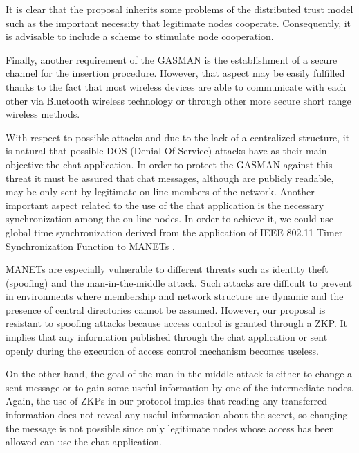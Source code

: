\documentclass{article}
\begin{document}
It is clear that the proposal inherits some problems of the distributed trust model such as the important necessity that legitimate nodes cooperate. Consequently, it is advisable to include a scheme to stimulate node cooperation.

Finally, another requirement of the GASMAN is the establishment of a secure channel for the insertion procedure. However, that aspect may be easily fulfilled thanks to the fact
that most wireless devices are able to communicate with each other via Bluetooth wireless technology or through other more secure short range wireless methods.

With respect to possible attacks and due to the lack of a centralized
structure, it is natural that possible DOS (Denial Of Service)
attacks have as their main objective the chat application. In
order to protect the GASMAN against this threat it must be assured
that chat messages, although are publicly readable, may be only
sent by legitimate on-line members of the network. Another
important aspect related to the use of the chat application is the
necessary synchronization among the on-line nodes. In order to achieve it, we could use global time synchronization derived from the application of IEEE 802.11 Timer Synchronization Function to MANETs \cite{XGPM07}.  

MANETs are especially vulnerable to different threats such as
identity theft (spoofing) and the man-in-the-middle attack. Such
attacks are difficult to prevent in environments where membership
and network structure are dynamic and the presence of central
directories cannot be assumed. However, our proposal is resistant
to spoofing attacks because access control is granted through a ZKP. It implies
that any information published through the chat application or sent openly during the execution of access control mechanism becomes useless.

On the other hand, the goal of the man-in-the-middle
attack is  either to change a sent message or to gain some useful
information by one of the intermediate nodes. Again, the use of
ZKPs in our protocol implies that reading any transferred
information does not reveal any useful information about the
secret, so changing the message is not possible since only
legitimate nodes whose access has been allowed can use the chat
application.
\end{document}
